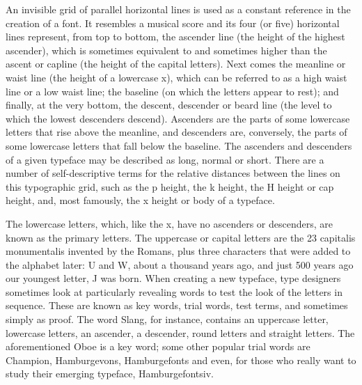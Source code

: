 \documentclass[12pt,a4paper,twocolumn]{book} %
\begin{document}
An invisible grid of parallel horizontal lines is used as a constant reference in the creation of a font. It resembles a musical score and its four (or five) horizontal lines represent, from top to bottom, the ascender line (the height of the highest ascender), which is sometimes equivalent to and sometimes higher than the ascent or capline (the height of the capital letters). Next comes the meanline or waist line (the height of a lowercase x), which can be referred to as a high waist line or a low waist line; the baseline (on which the letters appear to rest); and finally, at the very bottom, the descent, descender or beard line (the level to which the lowest descenders descend).
Ascenders are the parts of some lowercase letters that rise above the meanline, and descenders are, conversely, the parts of some lowercase letters that fall below the baseline. The ascenders and descenders of a given typeface may be described as long, normal or short. There are a number of self-descriptive terms for the relative distances between the lines on this typographic grid, such as the p height, the k height, the H height or cap height, and, most famously, the x height or body of a typeface.

The lowercase letters, which, like the x, have no ascenders or descenders, are known as the primary letters. The uppercase or capital letters are the 23 capitalis monumentalis invented by the Romans, plus three characters that were added to the alphabet later: U and W, about a thousand years ago, and just 500 years ago our youngest letter, J was born.
When creating a new typeface, type designers sometimes look at particularly revealing words to test the look of the letters in sequence. These are known as key words, trial words, test terms, and sometimes simply as proof. The word Slang, for instance, contains an uppercase letter, lowercase letters, an ascender, a descender, round letters and straight letters. The aforementioned Oboe is a key word; some other popular trial words are Champion, Hamburgevons, Hamburgefonts and even, for those who really want to study their emerging typeface, Hamburgefontsiv.
\end{document}
